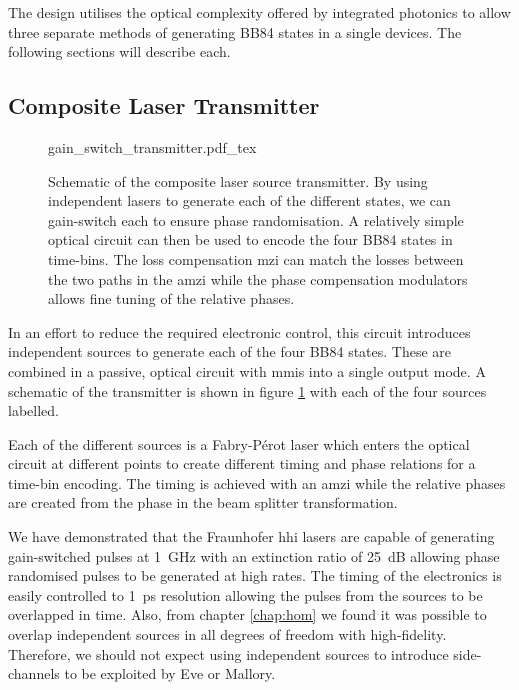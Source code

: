 The design utilises the optical complexity offered by integrated photonics to allow three separate methods of generating BB84 states in a single devices. The following sections will describe each.

\subsection{Composite Laser Transmitter}

\begin{figure}[t]
	\centering
	\def\svgwidth{\textwidth}
	{gain_switch_transmitter.pdf_tex}
		\caption[Schematic of the composite laser source transmitter]{Schematic of the composite laser source transmitter. By using independent lasers to generate each of the different states, we can gain-switch each to ensure phase randomisation. A relatively simple optical circuit can then be used to encode the four BB84 states in time-bins. The loss compensation \acs{mzi} can match the losses between the two paths in the \acs{amzi} while the phase compensation modulators allows fine tuning of the relative phases.}
	\label{fig:multiple_lasers_tx}
\end{figure}

In an effort to reduce the required electronic control, this circuit introduces independent sources to generate each of the four BB84 states. These are combined in a passive, optical circuit with \acp{mmi} into a single output mode. A schematic of the transmitter is shown in figure \ref{fig:multiple_lasers_tx} with each of the four sources labelled. 

Each of the different sources is a Fabry-P\'{e}rot laser which enters the optical circuit at different points to create different timing and phase relations for a time-bin encoding. The timing is achieved with an \ac{amzi} while the relative phases are created from the phase in the beam splitter transformation. 

We have demonstrated that the Fraunhofer \ac{hhi} lasers are capable of generating gain-switched pulses at \SI{1}{GHz} with an extinction ratio of \SI{25}{dB} allowing phase randomised pulses to be generated at high rates. The timing of the electronics is easily controlled to \SI{1}{ps} resolution allowing the pulses from the sources to be overlapped in time. Also, from chapter \ref{chap:hom} we found it was possible to overlap independent sources in all degrees of freedom with high-fidelity. Therefore, we should not expect using independent sources to introduce side-channels to be exploited by Eve or Mallory.

